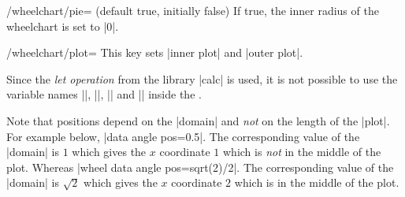 \documentclass[a4paper,english,dvipsnames]{ltxdoc}
\begin{document}
\begin{key}{/wheelchart/pie= (default true, initially false)}
If true, the inner radius of the wheelchart is set to |0|.
\end{key}
\begin{key}{/wheelchart/plot=}
This key sets |inner plot| and |outer plot|.

Since the \emph{let operation} from the \tikzname{} library |calc| is used, it is not possible to use the variable names |\n|, |\p|, |\x| and |\y| inside the .

Note that positions depend on the |domain| and \emph{not} on the length of the |plot|. For example below, |data angle pos=0.5|. The corresponding value of the |domain| is $1$ which gives the $x$ coordinate $1$ which is \emph{not} in the middle of the plot. Whereas |wheel data angle pos=sqrt(2)/2|. The corresponding value of the |domain| is $\sqrt{2}$ which gives the $x$ coordinate $2$ which is in the middle of the plot.
\begin{codeexample}[width=10cm]
\end{codeexample}
\begin{codeexample}[width=10cm]
\begin{tikzpicture}
\wheelchart[
    plot={{#1}:{0.5*(sin(#1*3)+1)+#2}}
]{\exampleforthismanual}
\end{tikzpicture}
\end{codeexample}
\begin{codeexample}[]
\begin{tikzpicture}
\wheelchart[
    domain=0:720,
    gap polar=5,
    plot={{#1*3.5/180},{sin(#1)-#2}},
    radius={0}{2},
    value=1,
    wheel data=\WCcount,
    wheel data pos=0.5
]{\exampleforthismanual}
\end{tikzpicture}
\end{codeexample}
\begin{codeexample}[width=10cm]
\begin{tikzpicture}
\wheelchart[
    arc data=\WCvarC,
    arc data dir={\WCmidangle<180?-1:1},
    arc data pos=0.5,
    data=,
    domain=0:900,
    plot={{#1}:
        {(((#1)*pi/180+15)^2-1)/300
            +(#2)-0.25}},
    radius={0}{0.5},
    slices arrow={1}{0},
    value=sqrt(3+\WCcount*pi*(pi+6)/7)-
        sqrt(3+(\WCcount-1)*pi*(pi+6)/7)

\end{tikzpicture}
\end{codeexample}
\end{key}
\end{document}
